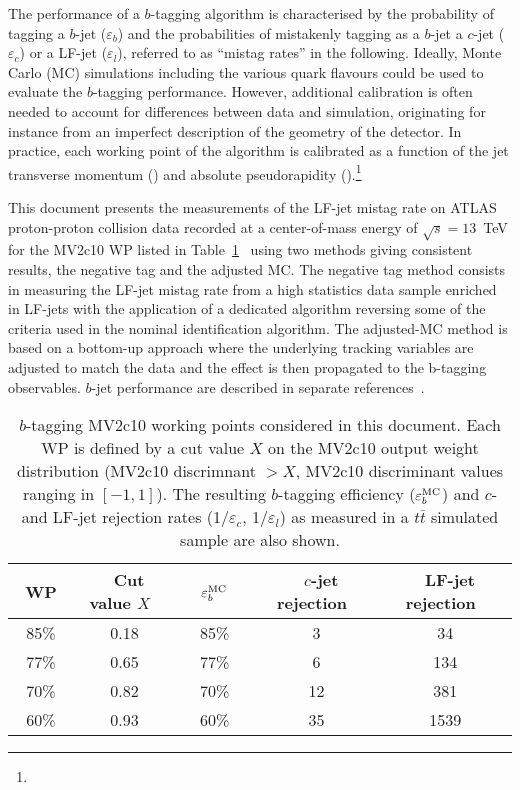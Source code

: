 The performance of a $b$-tagging algorithm is characterised by the probability of tagging a $b$-jet ($\varepsilon_b$) and the probabilities of mistakenly tagging as a $b$-jet a $c$-jet ($\varepsilon_c$) or a LF-jet ($\varepsilon_l$), referred to as ``mistag rates'' in the following. Ideally, Monte Carlo (MC) simulations including the various quark flavours could be used to evaluate the $b$-tagging performance. However, additional calibration is often needed to account for differences between data and simulation, originating for instance from an imperfect description of the geometry of the detector. In practice, each working point of the algorithm is calibrated as a function of the jet transverse momentum (\ptjet) and absolute pseudorapidity (\aetajet).\footnote{\AtlasCoordFootnote}

This document presents the measurements of the LF-jet mistag rate on ATLAS proton-proton collision data recorded at a center-of-mass energy of $\sqrt{s}=13$~TeV for the MV2c10 WP listed in Table~\ref{tab:wp}~\cite{this_work} using two methods giving consistent results, the negative tag and the adjusted MC. The negative tag method consists in measuring the LF-jet mistag rate from a high statistics data sample enriched in LF-jets with the application of a dedicated algorithm reversing some of the criteria used in the nominal identification algorithm. The adjusted-MC method is based on a bottom-up approach where the underlying tracking variables are adjusted to match the data and the effect is then propagated to the b-tagging observables. $b$-jet performance are described in separate references~\cite{calib1,calib2,calib3}.



\begin{table}[htb]
  \setlength\extrarowheight{3pt}
  \caption{$b$-tagging MV2c10 working points considered in this document. Each WP is defined by a cut value $X$ on the MV2c10 output weight distribution (MV2c10 discrimnant $> X$, MV2c10 discriminant values ranging in $[-1,1]$). The resulting $b$-tagging efficiency ($\varepsilon^{\textrm{MC}}_b$) and $c$- and LF-jet rejection rates (1/$\varepsilon_c$, 1/$\varepsilon_l$) as measured in a $t\bar{t}$ simulated sample are also shown.}
  \begin{center}
      \begin{tabular}{|c|c | c | cc|}
      \hline
      ~WP~ & ~Cut value $X$~ & ~~$\varepsilon^{\textrm{MC}}_b$~~ & ~$c$-jet rejection~ & ~LF-jet rejection~ \\[3.5pt]
      \hline
      85\% &     0.18  &     85\%   & 3   & 34 \\
      77\% &     0.65  &     77\%   & 6   & 134 \\
      70\% &     0.82  &     70\%   & 12  & 381 \\
      60\% &     0.93  &     60\%   & 35  & 1539 \\
      \hline
  \end{tabular}
  \end{center}
\label{tab:wp}
\end{table}


